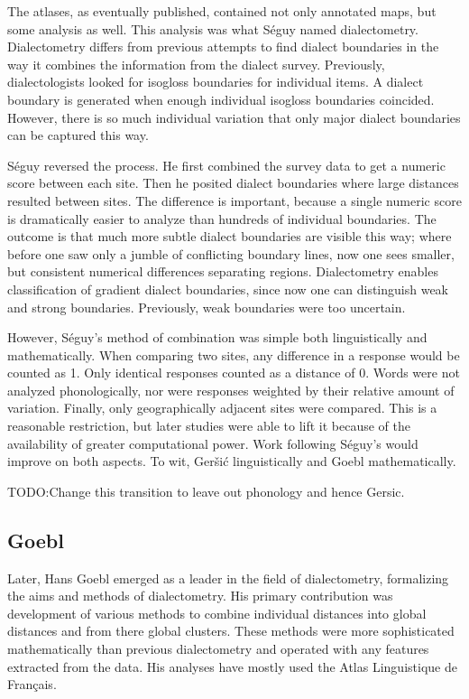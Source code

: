 \documentclass[11pt]{article}
\begin{document}
The atlases, as eventually published, contained not only annotated
maps, but some analysis as well. This analysis was what S\'eguy named
dialectometry. Dialectometry differs from previous attempts to find
dialect boundaries in the way it combines the information from the
dialect survey. Previously, dialectologists looked for isogloss
boundaries for individual items. A dialect boundary is generated when
enough individual isogloss boundaries coincided. However, there is so
much individual variation that only major dialect boundaries can
be captured this way.

S\'eguy reversed the process. He first combined the survey data to get
a numeric score between each site. Then he posited dialect boundaries
where large distances resulted between sites. The difference is
important, because a single numeric score is dramatically easier to
analyze than hundreds of individual boundaries. The outcome is that
much more subtle dialect boundaries are visible this way; where before
one saw only a jumble of conflicting boundary lines, now one sees
smaller, but consistent numerical differences separating regions. {Dialectometry
  enables classification of gradient dialect boundaries, since now one
can distinguish weak and strong boundaries. Previously, weak
boundaries were too uncertain.}

However, S\'eguy's method of combination was simple both
linguistically and mathematically. When comparing two sites, any
difference in a response would be counted as 1. Only identical
responses counted as a distance of 0. Words were not analyzed
phonologically, nor were responses weighted by their relative amount
of variation. Finally, only geographically adjacent sites were
compared. This is a reasonable restriction, but later studies were
able to lift it because of the availability of greater computational
power. Work following S\'eguy's would improve on both aspects. To wit,
Ger\v{s}i\'c linguistically and Goebl mathematically.

TODO:Change this transition to leave out phonology and hence Gersic.

\subsection{Goebl}

Later, Hans Goebl emerged as a leader in the field of dialectometry,
formalizing the aims and methods of dialectometry. His primary
contribution was development of various methods to combine individual
distances into global distances and from there global clusters. These
methods were more sophisticated mathematically than previous
dialectometry and operated with any features extracted from the data. His
analyses have mostly used the Atlas Linguistique de Fran\c{c}ais.
\end{document}
